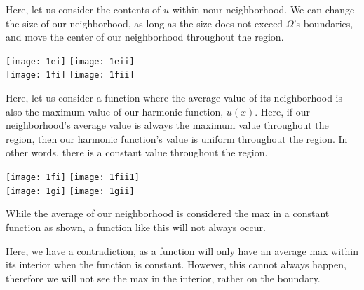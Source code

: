 Here, let us consider the contents of $u$ within nour neighborhood. We can change the size of our neighborhood, as long as the size does not exceed $\Omega$'s boundaries, and move the center of our neighborhood throughout the region.

\begin{center}
  \texttt{[image: 1ei]}
  \texttt{[image: 1eii]}\\
  \texttt{[image: 1fi]}
  \texttt{[image: 1fii]}\\
\end{center}

Here, let us consider a function where the average value of its neighborhood
is also the maximum value of our harmonic function, $u(x)$. Here, if our
neighborhood's average value is always the maximum value throughout the
region, then our harmonic function's value is uniform throughout the region.
In other words, there is a constant value throughout the region.

\begin{center}
  \texttt{[image: 1fi]}
  \texttt{[image: 1fii1]}\\
  \texttt{[image: 1gi]}
  \texttt{[image: 1gii]}\\
\end{center}

While the average of our neighborhood is considered the max in a constant function as shown, a function like this will not always occur.

Here, we have a contradiction, as a function will only have an average max within its interior when the function is constant. However, this cannot always happen, therefore we will not see the max in the interior, rather on the boundary.
